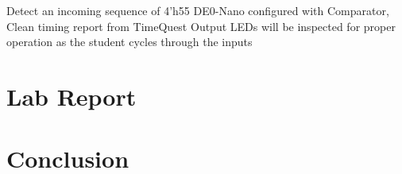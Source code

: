       {Detect an incoming sequence of 4'h55}
      {DE0-Nano configured with Comparator, Clean timing report from TimeQuest}
      {Output LEDs will be inspected for proper operation as the student cycles through the inputs}

\section{ Lab Report}
  
\section{ Conclusion}
 


